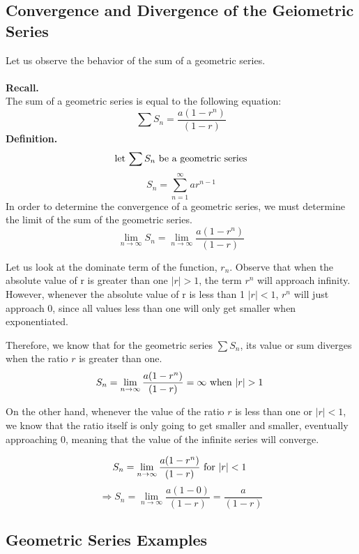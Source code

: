 \documentclass{report}
\begin{document}
\begin{sloppypar}
\subsection{Convergence and Divergence of the Geiometric Series}
      Let us observe the behavior of the sum of a geometric series.
      \\
      \\
      \textbf{Recall.}
      \\

      The sum of a geometric series is equal to the following equation:
      \[ \sum S_{n} = \frac{a(1-r^{n})}{(1-r)}\]
      \textbf{Definition.}
      \[ \textrm{let $ \sum S_{n} $ be a geometric series} \]
      \[ S_{n} = \sum_{n=1}^{\infty} ar^{n-1} \]
      In order to determine the convergence of a geometric series,
      we must determine the limit of the sum  of the geometric series.
      \[ \lim_{n \rightarrow \infty}  S_{n} = \lim_{n \rightarrow \infty} \frac{a(1-r^{n})}{(1-r)} \]

      Let us look at the dominate term of the function, $ r_{n} $. Observe
      that when the absolute value of r is greater than one  $ | r| > 1$, the term $ r^{n} $
      will approach infinity. However, whenever the absolute value of r is
      less than 1 $ | r| < 1$, $r^{n}$ will just approach 0, since all values less than one will
      only get smaller when exponentiated.

      Therefore, we know that for the geometric series $ \sum S_{n} $, its value or sum diverges
      when the ratio $ r $ is greater than one.
      \[ S_{n} = \lim_{n \rightarrow \infty} \frac{a(1-r^{n})}{(1-r)} = \infty \textrm{ when $ | r| > 1 $ } \]

      On the other hand, whenever the value of the ratio $ r $ is less than one or $ | r| < 1 $, we know
      that the ratio itself is only going to get smaller and smaller, eventually approaching 0, meaning
      that the value of the infinite series will converge.

      \[ S_{n} = \lim_{n \rightarrow \infty} \frac{a(1-r^{n})}{(1-r)} \textrm{ for $ |r| < 1$  }\]
      \[ \Rightarrow S_{n} = \lim_{n \rightarrow \infty} \frac{a(1-0)}{(1-r)} = \frac{a}{(1-r)}\]



\subsection{Geometric Series Examples}

\end{sloppypar}
\end{document}
